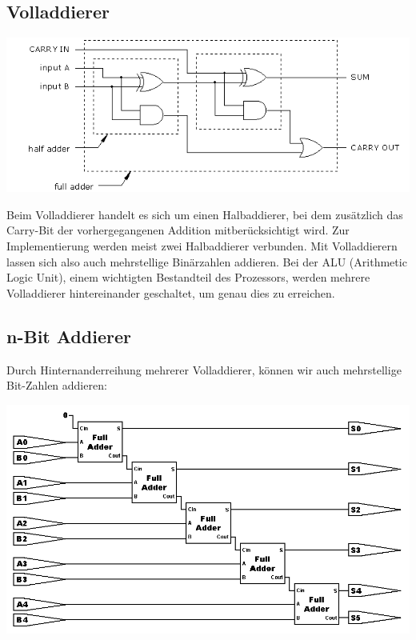 \documentclass[a4paper,10pt]{report}
\begin{document}
\subsection{Volladdierer}
\begin{center}\includegraphics[]{imgs/fulladder.png}\end{center}
Beim Volladdierer handelt es sich um einen Halbaddierer, bei dem zusätzlich das Carry-Bit der vorhergegangenen Addition mitberücksichtigt wird. Zur Implementierung werden meist zwei Halbaddierer verbunden. Mit Volladdierern lassen sich also auch mehrstellige Binärzahlen addieren. Bei der ALU (Arithmetic Logic Unit), einem wichtigten Bestandteil des Prozessors, werden mehrere Volladdierer hintereinander geschaltet, um genau dies zu erreichen.
\subsection{n-Bit Addierer}
Durch Hinternanderreihung mehrerer Volladdierer, können wir auch mehrstellige Bit-Zahlen addieren:
\begin{center}\includegraphics[scale=0.55]{imgs/Ripple.png}\end{center}
\end{document}
